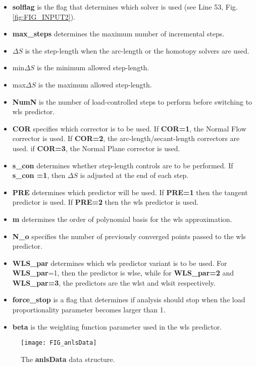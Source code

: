 \begin{appendices}
\noindent
\begin{itemize}
	\item \textbf{solflag} is the flag that determines which solver is used 
	(see Line 
	53, Fig. \ref{fig:FIG_INPUT2}).
	\item \textbf{max\_steps} determines the maximum number of incremental 
	steps.
	\item $\Delta S$ is the step-length when the arc-length or the homotopy 
	solvers are used.
	\item min$\Delta S$ is the minimum allowed step-length. 
	\item max$\Delta S$ is the maximum allowed step-length. 
	\item \textbf{NumN} is the number of load-controlled steps to perform 
	before 
	switching to \acrshort{wls} predictor.
	\item \textbf{COR} specifies which corrector is to be used. If 
	\textbf{COR=1}, the Normal 
	Flow corrector is used. If \textbf{COR=2}, the arc-length/secant-length 
	correctors 
	are used. if \textbf{COR=3}, the Normal Plane corrector is used.
	\item \textbf{s\_con} determines whether step-length controls are to be 
	performed. If \textbf{s\_con =1}, then $\Delta S$ is adjusted at the end of 
	each 
	step.
	\item \textbf{PRE} determines which predictor will be used. If 
	\textbf{PRE=1} then the 
	tangent predictor is used. If \textbf{PRE=2} then the \acrshort{wls} 
	predictor is 
	used.
	\item \textbf{m} determines the order of polynomial basis for the 
	\acrshort{wls} 
	approximation.
	\item \textbf{N\_o} specifies the number of previously converged points 
	passed to 
	the \acrshort{wls} predictor.
	\item \textbf{WLS\_par} determines which \acrshort{wls} predictor variant 
	is to 
	be used. For \textbf{WLS\_par}=1, then the predictor is \acrshort{wlse}, 
	while 
	for \textbf{WLS\_par=2} and \textbf{WLS\_par=3}, the predictors are the 
	\acrshort{wlst} and \acrshort{wlsit} respectively.
	\item \textbf{force\_stop} is a flag that determines if analysis should 
	stop when 
	the load proportionality parameter becomes larger than 1.
	\item \textbf{beta} is the weighting function parameter used in the 
	\acrshort{wls} 
	predictor. 
\end{itemize}

	\begin{figure}
		\centering
		\texttt{[image: FIG\_anlsData]}
		\caption{The \textbf{anlsData} data structure.}
		\label{fig:FIG_anlsData}
	\end{figure}
\end{appendices}